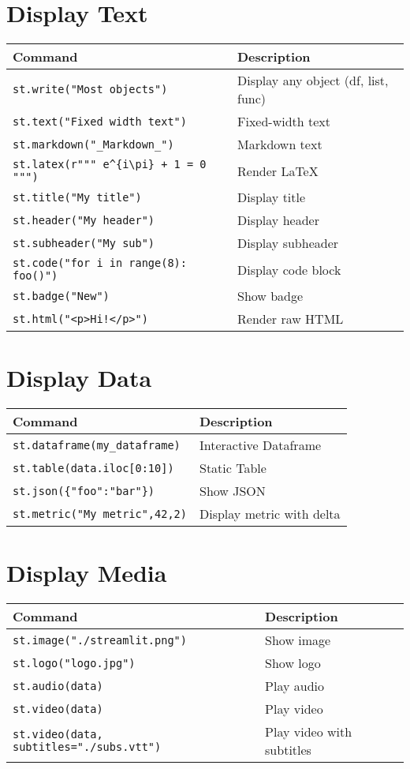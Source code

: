 \documentclass[11pt,a4paper]{article}
\begin{document}
\section*{Display Text}
\begin{longtable}{|L{7cm}|L{8cm}|}
\hline
\textbf{Command} & \textbf{Description} \\ \hline
\verb|st.write("Most objects")| & Display any object (df, list, func) \\ \hline
\verb|st.text("Fixed width text")| & Fixed-width text \\ \hline
\verb|st.markdown("_Markdown_")| & Markdown text \\ \hline
\verb|st.latex(r""" e^{i\pi} + 1 = 0 """)| & Render LaTeX \\ \hline
\verb|st.title("My title")| & Display title \\ \hline
\verb|st.header("My header")| & Display header \\ \hline
\verb|st.subheader("My sub")| & Display subheader \\ \hline
\verb|st.code("for i in range(8): foo()")| & Display code block \\ \hline
\verb|st.badge("New")| & Show badge \\ \hline
\verb|st.html("<p>Hi!</p>")| & Render raw HTML \\ \hline
\end{longtable}

\section*{Display Data}
\begin{longtable}{|L{6cm}|L{10cm}|}
\hline
\textbf{Command} & \textbf{Description} \\ \hline
\verb|st.dataframe(my_dataframe)| & Interactive Dataframe \\ \hline
\verb|st.table(data.iloc[0:10])| & Static Table \\ \hline
\verb|st.json({"foo":"bar"})| & Show JSON \\ \hline
\verb|st.metric("My metric",42,2)| & Display metric with delta \\ \hline
\end{longtable}

\section*{Display Media}
\begin{longtable}{|L{8cm}|L{8cm}|}
\hline
\textbf{Command} & \textbf{Description} \\ \hline
\verb|st.image("./streamlit.png")| & Show image \\ \hline
\verb|st.logo("logo.jpg")| & Show logo \\ \hline
\verb|st.audio(data)| & Play audio \\ \hline
\verb|st.video(data)| & Play video \\ \hline
\verb|st.video(data, subtitles="./subs.vtt")| & Play video with subtitles \\ \hline
\end{longtable}
\end{document}
